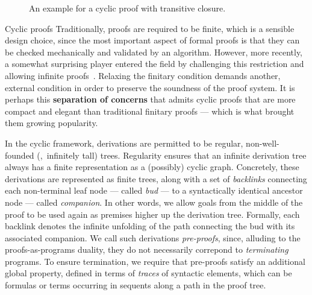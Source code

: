 \begin{figure}[b]

\caption{An example for a cyclic proof with transitive closure.}
\label{b2:tc-cyclic-example}
\end{figure}

\begin{paragraph}{Cyclic proofs}
Traditionally, proofs are required to be finite, which is a sensible design choice, since the most important aspect of formal proofs is that they can be checked mechanically and validated by an algorithm.
However, more recently, a somewhat surprising player entered the field by challenging this restriction and allowing infinite proofs~\cite{LICS2007:Brotherston}.
Relaxing the finitary condition demands another, external condition in order to preserve the soundness of the proof system.
It is perhaps this \textbf{separation of concerns} that admits cyclic proofs that are more compact and elegant than traditional finitary proofs --- which is what brought them growing popularity.

In the cyclic framework, derivations are permitted to be regular,
non-well-founded (\ie,~infinitely tall) trees.
Regularity ensures that an infinite derivation tree always has a finite representation
as a (possibly) cyclic graph.
Concretely, these derivations are represented as finite trees, 
along with a set of \emph{backlinks} connecting each
non-terminal leaf node --- called \emph{bud} ---
to a syntactically identical ancestor node --- called \emph{companion}.
In other words, we allow goals from the middle of the proof to be
used again as premises higher up the derivation tree.
Formally, each backlink denotes the infinite unfolding of the
path connecting the bud with its associated companion.
We call such derivations \emph{pre-proofs}, since, alluding to the proofs-as-programs duality, they do not necessarily correpond to \emph{terminating} programs.
To ensure termination, we require that pre-proofs satisfy
an additional global property, defined in terms of \emph{traces} of syntactic elements, which can be formulas or terms occurring in sequents along a path in the proof tree.


\end{paragraph}
